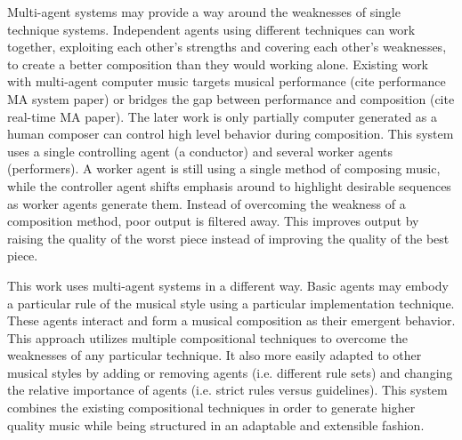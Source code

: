 Multi-agent systems may provide a way around the weaknesses of single technique systems.
Independent agents using different techniques can work together, exploiting each other's strengths and covering each other's weaknesses, to create a better composition than they would working alone.
Existing work with multi-agent computer music targets musical performance (cite performance MA system paper) or bridges the gap between performance and composition (cite real-time MA paper).
The later work is only partially computer generated as a human composer can control high level behavior during composition.
This system uses a single controlling agent (a conductor) and several worker agents (performers).
A worker agent is still using a single method of composing music, while the controller agent shifts emphasis around to highlight desirable sequences as worker agents generate them. 
Instead of overcoming the weakness of a composition method, poor output is filtered away.
This improves output by raising the quality of the worst piece instead of improving the quality of the best piece.

This work uses multi-agent systems in a different way. Basic agents may embody a particular rule of the musical style using a particular implementation technique.
These agents interact and form a musical composition as their emergent behavior.
This approach utilizes multiple compositional techniques to overcome the weaknesses of any particular technique.
It also more easily adapted to other musical styles by adding or removing agents (i.e. different rule sets) and changing the relative importance of agents (i.e. strict rules versus guidelines).
This system combines the existing compositional techniques in order to generate higher quality music while being structured in an adaptable and extensible fashion.
